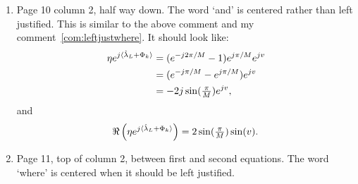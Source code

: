 \documentclass[a4paper,10pt]{article}
\begin{document}
\begin{enumerate}
\item Page 10 column 2, half way down.  The word `and' is centered rather than left justified.  This is similar to the above comment and my comment~\ref{com:leftjustwhere}.  It should look like:
\begin{align*}
\eta e^{j\langle \hat{\lambda}_L + \Phi_k \rangle} &= (e^{-j2\pi/M} - 1) e^{j \pi/M} e^{jv} \\
&= (e^{-j\pi/M} - e^{j\pi/M}) e^{jv} \\
&= -2 j \sin(\tfrac{\pi}{M}) e^{j v },
\end{align*}
and
\[
\Re\left( \eta e^{j\langle \hat{\lambda}_L + \Phi_k \rangle}\right) = 2 \sin(\tfrac{\pi}{M}) \sin(v).
\]

\item Page 11, top of column 2, between first and second equations.  The word `where' is centered when it should be left justified.



\end{enumerate}
\end{document}
